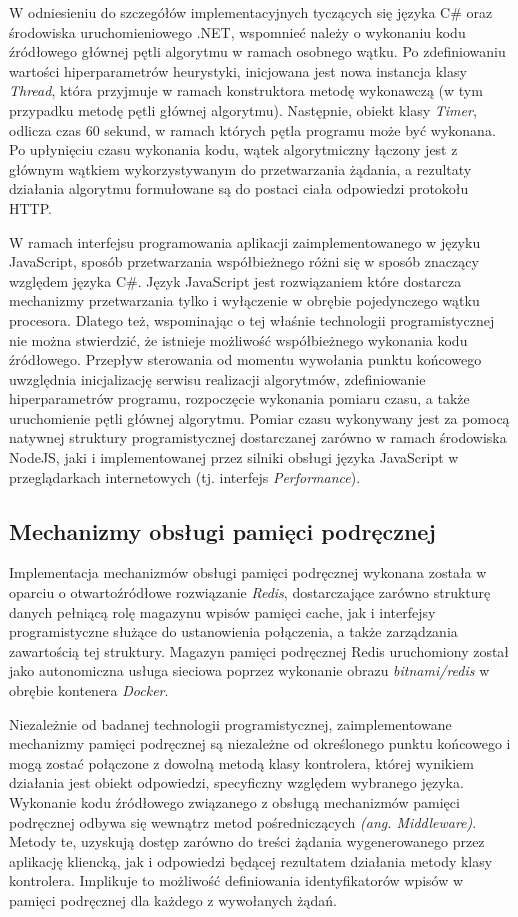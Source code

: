 W odniesieniu do szczegółów implementacyjnych tyczących się języka C\# oraz środowiska uruchomieniowego .NET, wspomnieć należy o wykonaniu kodu źródłowego głównej pętli algorytmu w ramach osobnego wątku. Po zdefiniowaniu wartości hiperparametrów heurystyki, inicjowana jest nowa instancja klasy \textit{Thread}, która przyjmuje w ramach konstruktora metodę wykonawczą (w tym przypadku metodę pętli głównej algorytmu). Następnie, obiekt klasy \textit{Timer}, odlicza czas 60 sekund, w ramach których pętla programu może być wykonana. Po upłynięciu czasu wykonania kodu, wątek algorytmiczny łączony jest z głównym wątkiem wykorzystywanym do przetwarzania żądania, a rezultaty działania algorytmu formułowane są do postaci ciała odpowiedzi protokołu HTTP.  


W ramach interfejsu programowania aplikacji zaimplementowanego w języku JavaScript, sposób przetwarzania współbieżnego różni się w sposób znaczący względem języka C\#. Język JavaScript jest rozwiązaniem które dostarcza mechanizmy przetwarzania tylko i wyłączenie w obrębie pojedynczego wątku procesora. Dlatego też, wspominając o tej właśnie technologii programistycznej nie można stwierdzić, że istnieje możliwość współbieżnego wykonania kodu źródłowego. Przepływ sterowania od momentu wywołania punktu końcowego uwzględnia inicjalizację serwisu realizacji algorytmów, zdefiniowanie hiperparametrów programu, rozpoczęcie wykonania pomiaru czasu, a także uruchomienie pętli głównej algorytmu. Pomiar czasu wykonywany jest za pomocą natywnej struktury programistycznej dostarczanej zarówno w ramach środowiska NodeJS, jaki i implementowanej przez silniki obsługi języka JavaScript w przeglądarkach internetowych (tj. interfejs \textit{Performance}).
\subsection*{Mechanizmy obsługi pamięci podręcznej}
Implementacja mechanizmów obsługi pamięci podręcznej wykonana została w oparciu o otwartoźródłowe rozwiązanie \textit{Redis}, dostarczające zarówno strukturę danych pełniącą rolę magazynu wpisów pamięci cache, jak i interfejsy programistyczne służące do ustanowienia połączenia, a także zarządzania zawartością tej struktury. Magazyn pamięci podręcznej Redis uruchomiony został jako autonomiczna usługa sieciowa poprzez wykonanie obrazu \textit{bitnami/redis} w obrębie kontenera \textit{Docker}.

Niezależnie od badanej technologii programistycznej, zaimplementowane mechanizmy pamięci podręcznej są niezależne od określonego punktu końcowego i mogą zostać połączone z dowolną metodą klasy kontrolera, której wynikiem działania jest obiekt odpowiedzi, specyficzny względem wybranego języka. Wykonanie kodu źródłowego związanego z obsługą mechanizmów pamięci podręcznej odbywa się wewnątrz metod pośredniczących \textit{(ang. Middleware)}. Metody te, uzyskują dostęp zarówno do treści żądania wygenerowanego przez aplikację kliencką, jak i odpowiedzi będącej rezultatem działania metody klasy kontrolera. Implikuje to możliwość definiowania identyfikatorów wpisów w pamięci podręcznej dla każdego z wywołanych żądań.

